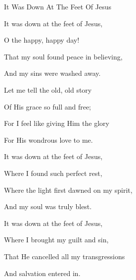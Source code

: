 \documentclass[12pt]{book}
\begin{document}
\begin{song}{It Was Down At The Feet Of Jesus}{}
  {\SBPubDom}
  {}
  {}
  {}

  \begin{SBVerse}
    It was down at the feet of Jesus,

    O the happy, happy day!

    That my soul found peace in believing,

    And my sins were washed away.
  \end{SBVerse}

  \begin{SBOpGroup}
    Let me tell the old, old story

    Of His grace so full and free;

    For I feel like giving Him the glory

    For His wondrous love to me.
  \end{SBOpGroup}

  \begin{SBVerse}
    It was down at the feet of Jesus,

    Where I found such perfect rest,

    Where the light first dawned on my spirit,

    And my soul was truly blest.
  \end{SBVerse}

  \begin{SBVerse}
    It was down at the feet of Jesus,

    Where I brought my guilt and sin,

    That He cancelled all my transgressions

    And salvation entered in.
  \end{SBVerse}
\end{song}
\end{document}
